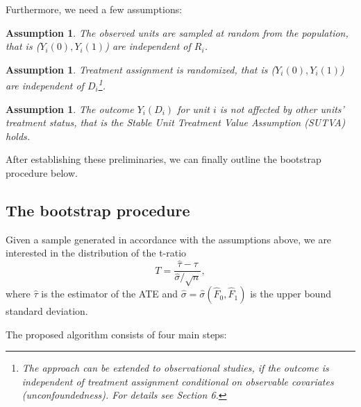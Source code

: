 \documentclass[aodsor,preprint]{imsart}
\numberwithin{equation}{section}
\theoremstyle{plain}
\newtheorem{assumption}[thm]{Assumption}
\begin{document}
Furthermore, we need a few assumptions:

\begin{assumption} \label{as1}
	The observed units are sampled at random from the population, that is ($Y_i(0), Y_i(1)$) are independent of $R_i$.
\end{assumption}
\begin{assumption} \label{as2}
	Treatment assignment is randomized, that is ($Y_i(0), Y_i(1)$) are independent of $D_i$\footnote{The approach can be extended to observational studies, if the outcome is independent of treatment assignment conditional on observable covariates (unconfoundedness). For details see \cite{Imbens_2021} Section 6.}.
\end{assumption}
\begin{assumption} \label{as3}
	The outcome $Y_i(D_i)$ for unit $i$ is not affected by other units' treatment status, that is the Stable Unit Treatment Value Assumption (SUTVA) holds.
\end{assumption}

After establishing these preliminaries, we can finally outline the bootstrap procedure below.

\subsection{The bootstrap procedure}

Given a sample generated in accordance with the assumptions above, we are interested in the distribution of the t-ratio
$$
T = \frac{\widehat{\tau} - \tau}{\widehat{\sigma} / \sqrt{n}},
$$
where $\widehat{\tau}$ is the estimator of the ATE and $\widehat{\sigma} = \widehat{\sigma}(\widehat{F}_0, \widehat{F}_1)$ is the upper bound standard deviation.

The proposed algorithm consists of four main steps:
\end{document}
